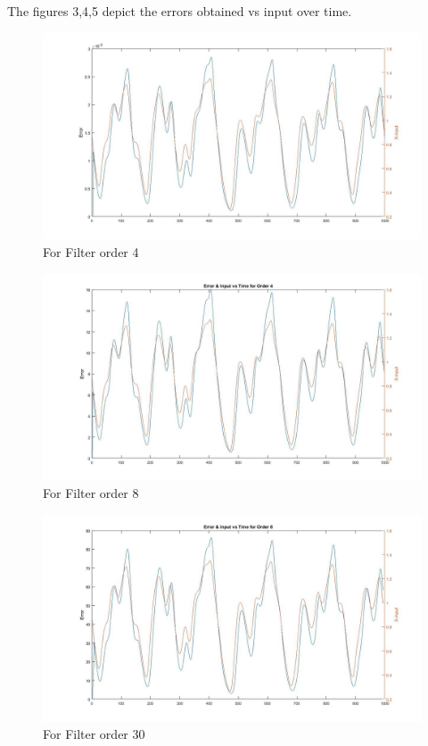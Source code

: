 \documentclass[10pt, letterpaper]{article}
\begin{document}
\begin{enumerate}
The figures 3,4,5 depict the errors obtained vs input over time.
\begin{figure}
\centering
\label{fig:four}
\caption{For Filter order 4}
\includegraphics[scale=0.25]{MSE}
\end{figure}
\begin{figure}
\centering
\label{fig:eight}
\caption{For Filter order 8}
\includegraphics[scale=0.25]{MSE1}
\end{figure}
\begin{figure}
\centering
\label{fig:thirty}
\caption{For Filter order 30}
\includegraphics[scale=0.25]{MSE2}
\end{figure}


\end{enumerate}
\end{document}
